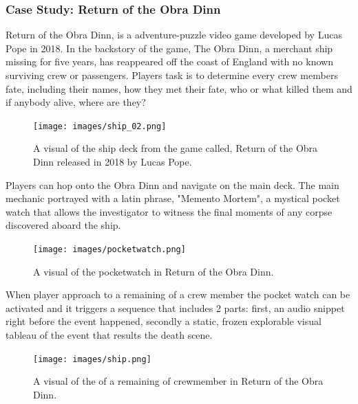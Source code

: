         \subsubsection{Case Study: Return of the Obra Dinn}
            Return of the Obra Dinn, is a adventure-puzzle video game developed by Lucas Pope in 2018. In the backstory of the game, The Obra Dinn, a merchant ship missing for five years, has reappeared off the coast of England with no known surviving crew or passengers. Players task is to determine every crew members fate, including their names, how they met their fate, who or what killed them and if anybody alive, where are they?\par

            \begin{figure}[H]
                \centering
                \texttt{[image: images/ship\_02.png]}
                \caption{A visual of the ship deck from the game called, Return of the Obra Dinn released in 2018 by Lucas Pope.}
                \label{fig:SHIP}
            \end{figure}

            Players can hop onto the Obra Dinn and navigate on the main deck. The main mechanic portrayed with a latin phrase, "Memento Mortem", a mystical pocket watch that allows the investigator to witness the final moments of any corpse discovered aboard the ship.\par 

            \begin{figure}[H]
                \centering
                \texttt{[image: images/pocketwatch.png]}
                \caption{A visual of the pocketwatch in Return of the Obra Dinn.}
                \label{fig:POCKETWATCH}
            \end{figure}

            When player approach to a remaining of a crew member the pocket watch can be activated and it triggers a sequence that includes 2 parts: first, an audio snippet right before the event happened, secondly a static, frozen explorable visual tableau of the event that results the death scene.\par

            \begin{figure}[H]
                \centering
                \texttt{[image: images/ship.png]}
                \caption{A visual of the of a remaining of crewmember in Return of the Obra Dinn.}
                \label{fig:CREWMEMBER}
            \end{figure}

